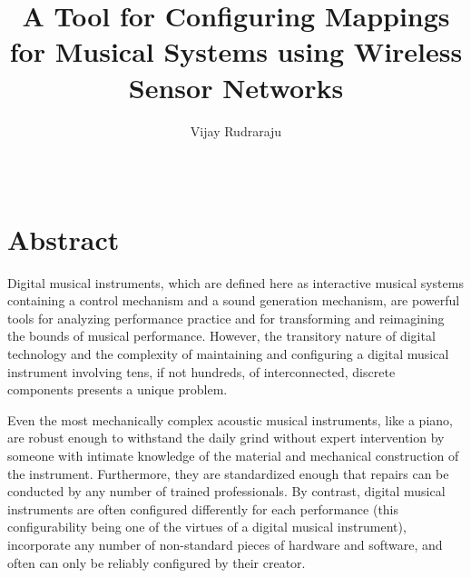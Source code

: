 \documentclass [12pt,letterpaper]{report}
\begin{document}

\title{A Tool for Configuring Mappings for Musical Systems using Wireless Sensor Networks}
\author{Vijay Rudraraju}
\date{\Month\ \number\year}

\maketitle

\raggedbottom
\onehalfspacing
{}

\section*{\centering Abstract}

Digital musical instruments, which are defined here as interactive musical systems containing a control mechanism and a sound generation mechanism, are powerful tools for analyzing performance practice and for transforming and reimagining the bounds of musical performance. However, the transitory nature of digital technology and the complexity of maintaining and configuring a digital musical instrument involving tens, if not hundreds, of interconnected, discrete components presents a unique problem. 

Even the most mechanically complex acoustic musical instruments, like a piano, are robust enough to withstand the daily grind without expert intervention by someone with intimate knowledge of the material and mechanical construction of the instrument. Furthermore, they are standardized enough that repairs can be conducted by any number of trained professionals. By contrast, digital musical instruments are often configured differently for each performance (this configurability being one of the virtues of a digital musical instrument), incorporate any number of non-standard pieces of hardware and software, and often can only be reliably configured by their creator.
\end{document}
